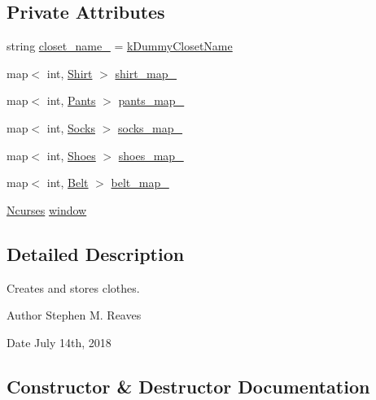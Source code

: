 \subsection*{Private Attributes}
\begin{DoxyCompactItemize}
\item 
string \mbox{\hyperlink{classCloset_a3c06676b90e6ebe31d6dd276f2f0bcef}{closet\+\_\+name\+\_\+}} = \mbox{\hyperlink{myCloset_8h_abe246d8af0c0b6020aa175c2874b59be}{k\+Dummy\+Closet\+Name}}
\item 
map$<$ int, \mbox{\hyperlink{classShirt}{Shirt}} $>$ \mbox{\hyperlink{classCloset_a8126a023a2777b84b23436da8d1f4b35}{shirt\+\_\+map\+\_\+}}
\item 
map$<$ int, \mbox{\hyperlink{classPants}{Pants}} $>$ \mbox{\hyperlink{classCloset_a8be78859dfab9e2aa09bfbbb8f191dab}{pants\+\_\+map\+\_\+}}
\item 
map$<$ int, \mbox{\hyperlink{classSocks}{Socks}} $>$ \mbox{\hyperlink{classCloset_a33a48dfc5ef542261bb0dd373f899f9e}{socks\+\_\+map\+\_\+}}
\item 
map$<$ int, \mbox{\hyperlink{classShoes}{Shoes}} $>$ \mbox{\hyperlink{classCloset_ab1e1ce9110a044c90244407f0f6f92c4}{shoes\+\_\+map\+\_\+}}
\item 
map$<$ int, \mbox{\hyperlink{classBelt}{Belt}} $>$ \mbox{\hyperlink{classCloset_a0631fe46e3c955109a613e1cd1d2cb52}{belt\+\_\+map\+\_\+}}
\item 
\mbox{\hyperlink{classNcurses}{Ncurses}} \mbox{\hyperlink{classCloset_af1eb4f786cc4eccd3018b90632236a93}{window}}
\end{DoxyCompactItemize}


\subsection{Detailed Description}
Creates and stores clothes. 

\begin{DoxyAuthor}{Author}
Stephen M. Reaves 
\end{DoxyAuthor}
\begin{DoxyDate}{Date}
July 14th, 2018 
\end{DoxyDate}


\subsection{Constructor \& Destructor Documentation}
\mbox{\label{classCloset_a42a132f9c1f9fe46976dea604f23055c}} 
